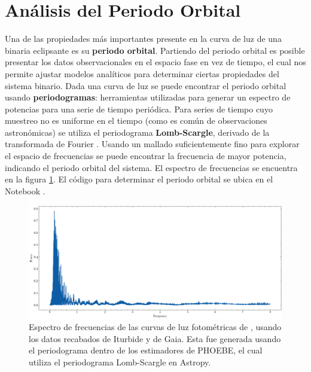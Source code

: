 \section{Análisis del Periodo Orbital} \label{metodologia:analisisperiodo}

Una de las propiedades más importantes presente en la curva de luz de una
binaria eclipsante es su \textbf{periodo orbital}. Partiendo del periodo orbital
es posible presentar los datos observacionales en el espacio fase en vez de
tiempo, el cual nos permite ajustar modelos analíticos para determinar ciertas
propiedades del sistema binario. Dada una curva de luz se puede encontrar el
periodo orbital usando \textbf{periodogramas}: herramientas utilizadas para
generar un espectro de potencias para una serie de tiempo periódica. Para series
de tiempo cuyo muestreo no es uniforme en el tiempo (como es común de
observaciones astronómicas) se utiliza el periodograma \textbf{Lomb-Scargle},
derivado de la transformada de Fourier .
Usando un mallado suficientemente fino para explorar el espacio de frecuencias
se puede encontrar la frecuencia de mayor potencia, indicando el periodo orbital
del sistema. El espectro de frecuencias se encuentra en la figura
\ref{periodogramaLSFrecs}. El código para determinar el periodo orbital se ubica
en el Notebook
\href{https://github.com/KnightIV/UANL_MAPTA_PlanObservaciones/blob/0b571b7377a76e0360d5e142924cc964194ace8b/analisis/phoebe_model/estimations/periodogram.ipynb}{}.


\begin{figure}[!ht]
	\centering
	\includegraphics[scale=0.55]{Metodologia/Secciones/AnalisisPeriodo/Figures/LS Power Spectrum.png}
	
	\caption{Espectro de frecuencias de las curvas de luz fotométricas de
	\atoObjIdNoSpace, usando los datos recabados de Iturbide y de Gaia. Esta fue
	generada usando el periodograma dentro de los estimadores de PHOEBE, el cual
	utiliza el periodograma Lomb-Scargle en Astropy.} 
	\label{periodogramaLSFrecs}
\end{figure}

